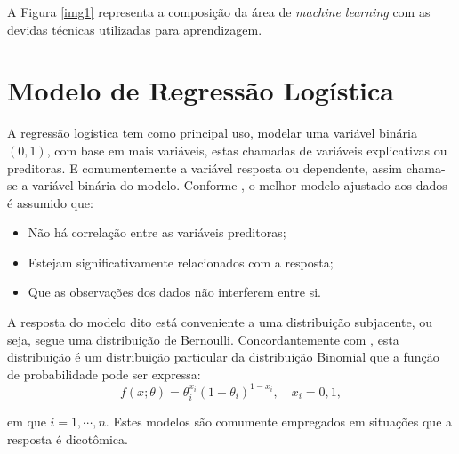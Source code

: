 \documentclass[
	12pt,				%
	openright,			%
	oneside,      %
	a4paper,			%
	english,			%
	french,				%
	spanish,			%
	brazil,				%
	]{abntex2}\usepackage[]{graphicx}\usepackage[table]{xcolor}
\theoremstyle{definition}
\begin{document}
A Figura \ref{img1} representa a composição da área de \textit{machine learning} com as devidas
técnicas utilizadas para aprendizagem.


  \section{Modelo de Regressão Logística}

  
A regressão logística tem como principal uso, modelar uma variável binária $(0,1)$,
com base em mais variáveis, estas chamadas de variáveis explicativas ou preditoras.
E comumentemente a variável resposta ou dependente, assim chama-se a variável
binária do modelo. Conforme \cite{hilbe2016practical}, o melhor modelo ajustado 
aos dados é assumido que:
\begin{itemize}
  \item Não há correlação entre as variáveis preditoras;
  \item Estejam significativamente relacionados com a resposta;
  \item Que as observações dos dados não interferem entre si.
\end{itemize}
  
A resposta do modelo dito está conveniente a uma distribuição subjacente, ou seja,
segue uma distribuição de Bernoulli. Concordantemente com \cite{bolfarine2010introduccao}, 
esta distribuição é um distribuição particular da distribuição Binomial que 
a função de probabilidade pode ser expressa:
\begin{equation}\label{bernoulli}
  f(x;\theta) = \theta_{i}^{x_i}(1 - \theta_{i})^{1 - x_i}, \quad x_i = 0,1,
\end{equation}

\noindent em que $i = 1,\cdots,n$. Estes modelos são comumente empregados em situações
que a resposta é dicotômica.
\end{document}
